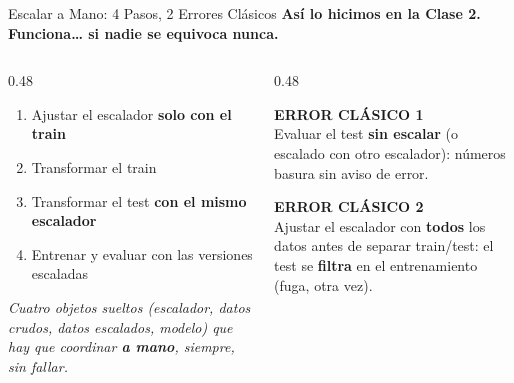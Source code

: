 \documentclass[aspectratio=169, 11pt]{beamer}
\begin{document}
\begin{frame}[shrink=8]{Escalar a Mano: 4 Pasos, 2 Errores Clásicos}
  \vspace{-4pt}
  {\small\color{arcaDark}\bfseries
    Así lo hicimos en la Clase 2. Funciona\ldots{} si nadie se equivoca nunca.}

  \vspace{8pt}
  \begin{columns}[T]
    \begin{column}{0.48\textwidth}
      {\footnotesize\color{textMuted}
      \begin{enumerate}\setlength{\itemsep}{5pt}
        \item Ajustar el escalador \textbf{solo con el train}
        \item Transformar el train
        \item Transformar el test \textbf{con el mismo escalador}
        \item Entrenar y evaluar con las versiones escaladas
      \end{enumerate}
      }
      \vspace{6pt}
      {\scriptsize\color{textMuted}\itshape
        Cuatro objetos sueltos (escalador, datos crudos, datos escalados,
        modelo) que hay que coordinar \textbf{a mano}, siempre, sin fallar.}
    \end{column}
    \begin{column}{0.48\textwidth}
      \begin{tcolorbox}[colback=arcaGray, colframe=arcaRed, boxrule=0pt, leftrule=3pt,
        arc=3pt, left=6pt, right=6pt, top=5pt, bottom=5pt]
        {\scriptsize\color{arcaRed}\bfseries\faTimes\hspace{4pt}ERROR CLÁSICO 1}\\[3pt]
        {\scriptsize\color{textMuted}
          Evaluar el test \textbf{sin escalar} (o escalado con otro
          escalador): números basura sin aviso de error.}
      \end{tcolorbox}
      \vspace{6pt}
      \begin{tcolorbox}[colback=arcaGray, colframe=arcaRed, boxrule=0pt, leftrule=3pt,
        arc=3pt, left=6pt, right=6pt, top=5pt, bottom=5pt]
        {\scriptsize\color{arcaRed}\bfseries\faTimes\hspace{4pt}ERROR CLÁSICO 2}\\[3pt]
        {\scriptsize\color{textMuted}
          Ajustar el escalador con \textbf{todos} los datos antes de
          separar train/test: el test se \textbf{filtra} en el
          entrenamiento (fuga, otra vez).}
      \end{tcolorbox}
    \end{column}
  \end{columns}
\end{frame}
\end{document}
